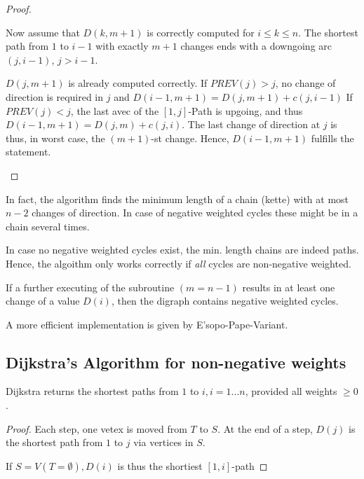 \begin{proof}
\begin{itemize}
Now assume that $D(k, m+1)$ is correctly computed for $i \leq k \leq n$. The
shortest path from $1$ to $i-1$ with exactly $m+1$ changes ends with a
downgoing arc $(j, i-1)$, $j > i-1$.

$D(j, m+1)$ is already computed correctly. If $PREV(j) > j$, no change of
direction is required in $j$ and $D(i-1, m+1) = D(j, m+1) + c(j,i-1)$
If $PREV(j) < j$, the last avec of the $[1,j]$-Path is upgoing, and thus $D(i-1,m+1)=D(j,m)+c(j,i)$. The last change of direction at $j$ is thus, in worst case, the $(m+1)$-st change. Hence, $D(i-1,m+1)$ fulfills the statement. 
\end{itemize}
\end{proof}

\begin{rem}
In fact, the algorithm finds the minimum length of a chain (kette) with at most $n-2$ changes of direction. In case of negative weighted cycles these might be in a chain several times. 

In case no negative weighted cycles exist, the min. length chains are indeed paths. Hence, the algoithm only works correctly if \emph{all} cycles are non-negative weighted.
\end{rem}

\begin{rem}
If a further executing of the subroutine $(m=n-1)$ results in at least one change of a value $D(i)$, then the digraph contains negative weighted cycles.
\end{rem}

\begin{rem}
A more efficient implementation is given by E'sopo-Pape-Variant.
\end{rem}

\subsection*{Dijkstra's Algorithm for non-negative weights}

\begin{thm}
Dijkstra returns the shortest paths from $1$ to $i, i= 1 ... n$, provided all weights $\geq 0$.
\end{thm}

\begin{proof}
Each step, one vetex is moved from $T$ to $S$. At the end of a step, $D(j)$ is the shortest path from $1$ to $j$ via vertices in $S$. 

If $S=V (T= \emptyset), D(i)$ is thus the shortiest $[1,i]$-path
\end{proof}

